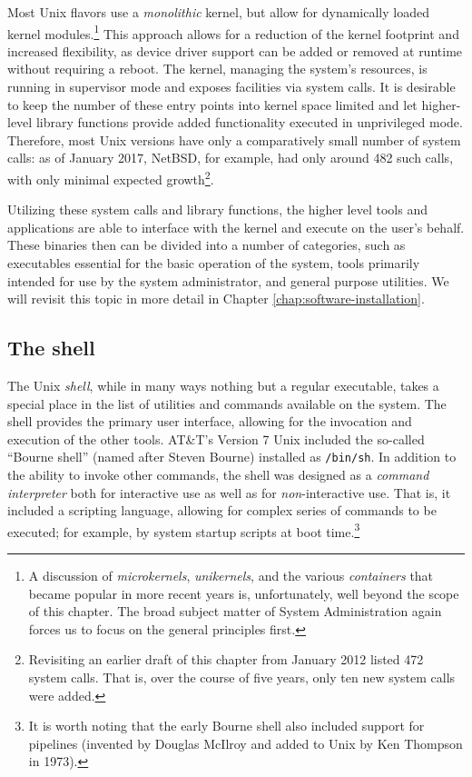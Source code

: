 Most Unix flavors use a {\em
monolithic} kernel, but allow
for dynamically loaded kernel
modules.\footnote{A
discussion of {\em microkernels},
{\em unikernels}, and the various
{\em containers} that became popular in more recent
years is, unfortunately, well beyond the scope of this
chapter.  The broad subject matter of System
Administration again forces us to focus on the general
principles first.}    This approach allows for a
reduction of the kernel footprint and increased
flexibility, as device driver support can be added or
removed at runtime without requiring a reboot.  The
kernel, managing the system's resources, is running in
supervisor mode and exposes facilities via system
calls.  It is desirable to keep the number of these
entry points into kernel space limited and let
higher-level library functions provide added
functionality executed in unprivileged mode.
Therefore, most Unix versions have only a
comparatively small number of system calls: as of
January 2017,  NetBSD, for example, had
only around 482 such
calls\cite{history:nbsd-syscalls}, with only minimal
expected growth\footnote{Revisiting an earlier draft
of this chapter from January 2012 listed 472 system
calls.  That is, over the course of five years, only
ten new system calls were added.}.

Utilizing these system calls and library functions,
the higher level tools and applications are able to
interface with the kernel and execute on the user's
behalf.  These binaries then can be divided into a
number of categories, such as executables essential
for the basic operation of the system, tools primarily
intended for use by the system administrator, and
general purpose utilities.  We will revisit this
topic in more detail in Chapter
\ref{chap:software-installation}.

\subsection{The shell}
\label{unix:basics:shell}

The Unix {\em shell}, while in many ways nothing but a
regular executable, takes a special place in the list
of utilities and commands available on the system.
The shell provides the primary user interface,
allowing for the invocation and execution of the other
tools.  AT\&T's Version 7 Unix included the so-called
``Bourne shell'' (named after
Steven Bourne) installed
as {\tt /bin/sh}.  In addition to the ability to
invoke other commands, the shell was designed as a
{\em command interpreter} both for interactive use as
well as for {\em non}-interactive use.  That is, it
included a scripting language, allowing for complex
series of commands to be executed; for example, by
system startup scripts at boot time.\footnote{It is
worth noting that the early Bourne shell also included
support for pipelines (invented by Douglas McIlroy and
added to Unix by Ken Thompson in 1973).}

